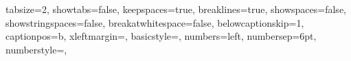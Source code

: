 
 {
  tabsize=2,
	showtabs=false,
	keepspaces=true,
  breaklines=true,
  showspaces=false,
  showstringspaces=false,
	breakatwhitespace=false,
  belowcaptionskip=1\baselineskip,
	captionpos=b,
  xleftmargin=\parindent,
	basicstyle=\ttfamily\scriptsize,
  numbers=left,
  numbersep=6pt,
	numberstyle=\tiny\color{lavenderindigo},
}
